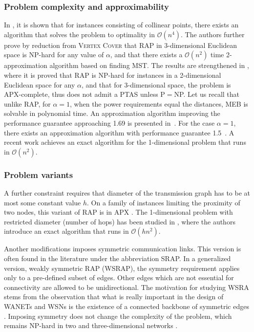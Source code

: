 \subsubsection{Problem complexity and approximability}

In \cite{kirousis00}, it is shown that for instances consisting of collinear points, there exists an algorithm that solves the problem to optimality in $\mathcal{O}(n^4)$.
The authors further prove by reduction from \textsc{Vertex Cover} that RAP in 3-dimensional Euclidean space is NP-hard for any value of $\alpha$,
and that there exists a $\mathcal{O}(n^2)$ time 2-approximation algorithm based on finding MST.
The results are strengthened in \cite{clementi99}, where it is proved that RAP is NP-hard for instances in a 2-dimensional Euclidean space for any $\alpha$, 
and that for 3-dimensional space, the problem is APX-complete, thus does not admit a PTAS unless P$=$NP.
Let us recall that unlike RAP, for $\alpha=1$, when the power requirements equal the distances, MEB  is solvable in polynomial time.
An approximation algorithm improving the performance guarantee approaching 1.69 is presented in~\cite{calinescu02}.
For the case $\alpha=1$, there exists an approximation algorithm with performance guarantee 1.5~\cite{ambuhl03}.
A recent work \cite{carmi15} achieves an exact algorithm for the 1-dimensional problem that runs in $\mathcal{O}(n^2)$.

\subsubsection{Problem variants}

A further constraint requires that diameter of the transmission graph has to be at most some constant value $h$.
On a family of instances limiting the proximity of two nodes, this variant of RAP is in APX \cite{clementi01b}.
The 1-dimensional problem with restricted diameter (number of hops) has been studied in \cite{clementi03}, where the authors introduce an exact algorithm that runs in $\mathcal{O}(hn^2)$.

Another modifications imposes symmetric communication links.
This version is often found in the literature under the abbreviation SRAP.
In a generalized version, weakly symmetric RAP (WSRAP), the symmetry requirement applies only to a pre-defined subset of edges.
Other edges which are not essential for connectivity are allowed to be unidirectional.
The motivation for studying WSRA stems from the observation that what is really important in the design of WANETs and WSNs is the existence of a connected backbone of symmetric edges \cite{santi05}.
Imposing symmetry does not change the complexity of the problem, which remains NP-hard in two and three-dimensional networks \cite{blough02}.

